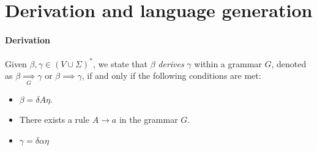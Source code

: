 \section{Derivation and language generation}

\paragraph*{Derivation}
 Given $\beta, \gamma \in (V \cup \Sigma)^{*}$, we state that $\beta$ \emph{derives} $\gamma$ within a grammar $G$, denoted as $\beta\underset{G}{\implies}\gamma$ or $\beta\implies\gamma$,  if and only if the following conditions are met:
\begin{itemize}
    \item $\beta=\delta A \eta$. 
    \item There exists a rule $A\rightarrow a$ in the grammar $G$. 
    \item $\gamma=\delta\alpha\eta$
\end{itemize}

